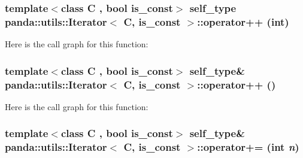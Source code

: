 \label{classpanda_1_1utils_1_1Iterator_a32ddcf2f54f2bb722cb62871759a6a84}
\hypertarget{classpanda_1_1utils_1_1Iterator_a49288cb09036ba77ee9a4e58ce320507}{
\subsubsection[{operator++}]{\setlength{\rightskip}{0pt plus 5cm}template$<$class C , bool is\_\-const$>$ {\bf self\_\-type} {\bf panda::utils::Iterator}$<$ C, is\_\-const $>$::operator++ (int)}}
\label{classpanda_1_1utils_1_1Iterator_a49288cb09036ba77ee9a4e58ce320507}


Here is the call graph for this function:\hypertarget{classpanda_1_1utils_1_1Iterator_a4eb53779fe25646b72d1cbe9cab3c724}{
\subsubsection[{operator++}]{\setlength{\rightskip}{0pt plus 5cm}template$<$class C , bool is\_\-const$>$ {\bf self\_\-type}\& {\bf panda::utils::Iterator}$<$ C, is\_\-const $>$::operator++ ()}}
\label{classpanda_1_1utils_1_1Iterator_a4eb53779fe25646b72d1cbe9cab3c724}


Here is the call graph for this function:\hypertarget{classpanda_1_1utils_1_1Iterator_a0ddae9be72f0c2644c2c2d72ee0ae51b}{
\subsubsection[{operator+=}]{\setlength{\rightskip}{0pt plus 5cm}template$<$class C , bool is\_\-const$>$ {\bf self\_\-type}\& {\bf panda::utils::Iterator}$<$ C, is\_\-const $>$::operator+= (int {\em n})}}
\label{classpanda_1_1utils_1_1Iterator_a0ddae9be72f0c2644c2c2d72ee0ae51b}


